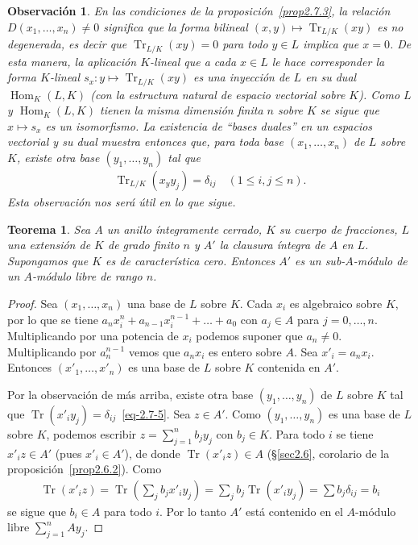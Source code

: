 \documentclass[10pt,oneside,bibtotoc,smallheadings,leqno,a5paper,DIV=12]{scrbook}
\newcommand{\QED}{}%
\DeclareMathOperator{\Tr}{Tr}
\DeclareMathOperator{\Hom}{Hom}
\numberwithin{equation}{section}
\theoremstyle{defi}
\theoremstyle{enonce}
\newtheorem{theorem}{Teorema}
\theoremstyle{rem}
\newtheorem*{remark*}{Observaci\'on}
\numberwithin{theorem}{section}
\numberwithin{proposition}{section}
\numberwithin{definition}{section}
\numberwithin{lemma}{section}
\numberwithin{corollary}{section}
\numberwithin{example}{section}
\numberwithin{footnote}{section}%
\begin{document}
\begin{remark*}
En las condiciones de la proposici\'on~\ref{prop2.7.3}, la relaci\'on $D(x_{1},\dots,x_{n})\neq 0$ significa que
la forma bilineal $(x,y)\mapsto\Tr_{L/K}(xy)$ es {\em no degenerada,} es decir que $\Tr_{L/K}(xy) = 0$
para todo $y\in L$ implica que $x = 0$. De esta manera, la aplicaci\'on $K$-lineal que a cada $x\in L$
le hace corresponder la forma $K$-lineal $s_{x}:y\mapsto\Tr_{L/K}(xy)$ es una inyecci\'on de $L$ en su
dual $\Hom_{K}(L,K)$ (con la estructura natural de espacio vectorial sobre $K$). Como $L$ y $\Hom_{K}(L,K)$
tienen la misma dimensi\'on finita $n$ sobre $K$ se sigue que $x\mapsto s_{x}$ es un isomorfismo. La
existencia de {\em ``bases duales''} en un espacios vectorial y su dual muestra entonces que, para toda
base $(x_{1},\dots,x_{n})$ de $L$ sobre $K$, existe otra base $(y_{1},\dots,y_{n})$ tal que
\begin{gather}\label{eq-2.7-5}
\Tr_{L/K}(x_{y}y_{j}) = \delta_{ij}\quad(1\leq i, j\leq n).
\end{gather}
Esta observaci\'on nos ser\'a \'util en lo que sigue.
\end{remark*}

\begin{theorem}\label{teo2.7.1}
Sea $A$ un anillo \'integramente cerrado, $K$ su cuerpo de fracciones, $L$ una extensi\'on de $K$ de grado
finito $n$ y $A'$ la clausura \'integra de $A$ en $L$. Supongamos que $K$ es de caracter\'istica cero.
Entonces $A'$ es un sub-$A$-m\'odulo  de un $A$-m\'odulo libre de rango $n$.
\end{theorem}

\begin{proof}
Sea $(x_{1},\dots,x_{n})$ una base de $L$ sobre $K$. Cada $x_{i}$ es algebraico sobre $K$, por lo que se tiene
$a_{n}x_{i}^{n}+a_{n-1}x_{i}^{n-1}+\dots+a_{0}$ con $a_{j}\in A$ para $j=0,\dots,n$. Multiplicando por
una potencia de $x_{i}$ podemos suponer que $a_{n}\neq 0$. Multiplicando por $a_{n}^{n-1}$ vemos que $a_{n}x_{i}$
es entero sobre $A$. Sea $x'_{i} = a_{n}x_{i}$. Entonces $(x'_{1},\dots,x'_{n})$ es una base de $L$ sobre $K$
contenida en $A'$.

Por la observaci\'on de m\'as arriba, existe otra base $(y_{1},\dots,y_{n})$ de $L$ sobre $K$ tal que
$\Tr(x'_{i}y_{j}) = \delta_{ij}$~\eqref{eq-2.7-5}. Sea $z\in A'$. Como $(y_{1},\dots,y_{n})$ es una base de $L$
sobre $K$, podemos escribir $z = \sum_{j=1}^{n}b_{j}y_{j}$ con $b_{j}\in K$. Para todo $i$ se tiene
$x'_{i}z\in A'$ (pues $x'_{i}\in A'$), de donde $\Tr(x'_{i}z)\in A$ (\S\ref{sec2.6}, corolario de la
proposici\'on~\ref{prop2.6.2}). Como
\begin{gather*}
\Tr(x'_{i}z) = \Tr\left(\sum_{j}b_{j}x'_{i}y_{j}\right) = \sum_{j}b_{j}\Tr(x'_{i}y_{j}) = \sum b_{j}\delta_{ij} = b_{i}
\end{gather*}
se sigue que $b_{i}\in A$ para todo $i$. Por lo tanto $A'$ est\'a contenido en el $A$-m\'odulo libre
$\sum_{j=1}^{n}Ay_{j}$. \QED
\end{proof}
\end{document}
